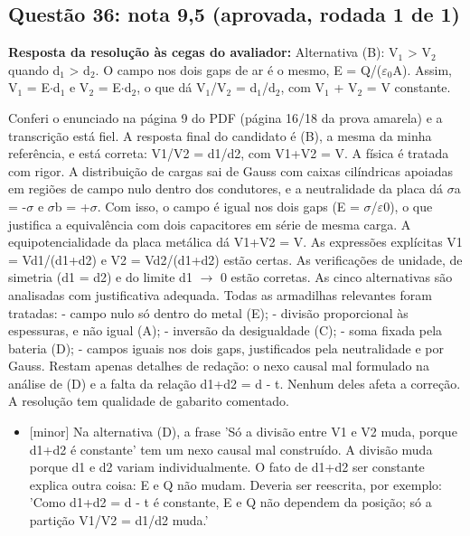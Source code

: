 \documentclass{article}%
\begin{document}
\subsection*{Questão 36: nota 9,5 (aprovada, rodada 1 de 1)}%
\textbf{Resposta da resolução às cegas do avaliador:} Alternativa (B): V$_{1}$ > V$_{2}$ quando d$_{1}$ > d$_{2}$. O campo nos dois gaps de ar é o mesmo, E = Q/($\varepsilon$$_{0}$A). Assim, V$_{1}$ = E$\cdot$d$_{1}$ e V$_{2}$ = E$\cdot$d$_{2}$, o que dá V$_{1}$/V$_{2}$ = d$_{1}$/d$_{2}$, com V$_{1}$ + V$_{2}$ = V constante.\par %
Conferi o enunciado na página 9 do PDF (página 16/18 da prova amarela) e a transcrição está fiel. A resposta final do candidato é (B), a mesma da minha referência, e está correta: V1/V2 = d1/d2, com V1+V2 = V.\newline%
\newline%
A física é tratada com rigor. A distribuição de cargas sai de Gauss com caixas cilíndricas apoiadas em regiões de campo nulo dentro dos condutores, e a neutralidade da placa dá $\sigma$a = -$\sigma$ e $\sigma$b = +$\sigma$. Com isso, o campo é igual nos dois gaps (E = $\sigma$/$\varepsilon$0), o que justifica a equivalência com dois capacitores em série de mesma carga. A equipotencialidade da placa metálica dá V1+V2 = V. As expressões explícitas V1 = Vd1/(d1+d2) e V2 = Vd2/(d1+d2) estão certas. As verificações de unidade, de simetria (d1 = d2) e do limite d1 $\to$ 0 estão corretas.\newline%
\newline%
As cinco alternativas são analisadas com justificativa adequada. Todas as armadilhas relevantes foram tratadas:\newline%
{-} campo nulo só dentro do metal (E);\newline%
{-} divisão proporcional às espessuras, e não igual (A);\newline%
{-} inversão da desigualdade (C);\newline%
{-} soma fixada pela bateria (D);\newline%
{-} campos iguais nos dois gaps, justificados pela neutralidade e por Gauss.\newline%
\newline%
Restam apenas detalhes de redação: o nexo causal mal formulado na análise de (D) e a falta da relação d1+d2 = d - t. Nenhum deles afeta a correção. A resolução tem qualidade de gabarito comentado.%
\begin{itemize}%
\item%
{[}minor{]} Na alternativa (D), a frase 'Só a divisão entre V1 e V2 muda, porque d1+d2 é constante' tem um nexo causal mal construído. A divisão muda porque d1 e d2 variam individualmente. O fato de d1+d2 ser constante explica outra coisa: E e Q não mudam. Deveria ser reescrita, por exemplo: 'Como d1+d2 = d - t é constante, E e Q não dependem da posição; só a partição V1/V2 = d1/d2 muda.'%

\end{itemize}$$
\end{document}
